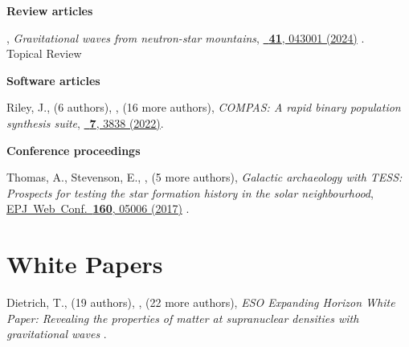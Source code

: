 \textbf{Review articles}

\begin{samepage}

\begin{publist}
    \item \fgittins,
    \textit{Gravitational waves from neutron-star mountains},
    \href{https://doi.org/10.1088/1361-6382/ad1c35}%
    {\cqg\ \textbf{41}, 043001 (2024)}
    . \\
    Topical Review
\end{publist}

\end{samepage}

\textbf{Software articles}

\begin{publist}
    \item Riley, J., (6 authors), \fgittins, (16 more authors),
    \textit{COMPAS: A rapid binary population synthesis suite},
    \href{https://doi.org/10.21105/joss.03838}%
    {\joss\ \textbf{7}, 3838 (2022)}.
\end{publist}

\textbf{Conference proceedings}

\begin{publist}
    \item Thomas, A., Stevenson, E., \fgittins, (5 more authors),
    \textit{Galactic archaeology with TESS: Prospects for testing the star
    formation history in the solar neighbourhood},
    \href{https://doi.org/10.1051/epjconf/201716005006}%
    {EPJ\ Web\ Conf.\ \textbf{160}, 05006 (2017)}
    .
\end{publist}

\section{White Papers}

\secstartswithlist{}%
\begin{publist}
    \item Dietrich, T., (19 authors), \fgittins, (22 more authors),
    \textit{ESO Expanding Horizon White Paper: Revealing the properties of
    matter at supranuclear densities with gravitational waves}
    .
\end{publist}
